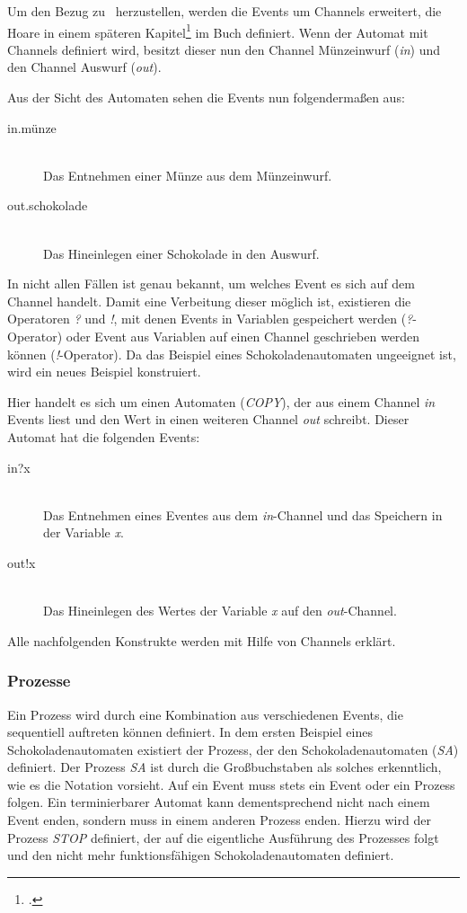 Um den Bezug zu \CA\ herzustellen, werden die Events um Channels erweitert, die Hoare in einem späteren Kapitel\footcite[Kap. 4.2]{CSPBOOK} im Buch definiert.
Wenn der Automat mit Channels definiert wird, besitzt dieser nun den Channel Münzeinwurf (\textit{in}) und den Channel Auswurf (\textit{out}).

Aus der Sicht des Automaten sehen die Events nun folgendermaßen aus:

\begin{description}
\item[in.münze]\hfill \\
Das Entnehmen einer Münze aus dem Münzeinwurf.
\item[out.schokolade]\hfill \\
Das Hineinlegen einer Schokolade in den Auswurf.
\end{description}

In nicht allen Fällen ist genau bekannt, um welches Event es sich auf dem Channel handelt. Damit eine Verbeitung dieser möglich ist, existieren die Operatoren \textit{?} und \textit{!}, mit denen Events in Variablen gespeichert werden (\textit{?}-Operator) oder Event aus Variablen auf einen Channel geschrieben werden können (\textit{!}-Operator). Da das Beispiel eines Schokoladenautomaten ungeeignet ist, wird ein neues Beispiel konstruiert. 

Hier handelt es sich um einen Automaten (\textit{COPY}), der aus einem Channel \textit{in} Events liest und den Wert in einen weiteren Channel \textit{out} schreibt. Dieser Automat hat die folgenden Events:

\begin{description}
\item[in?x]\hfill \\
Das Entnehmen eines Eventes aus dem \textit{in}-Channel und das Speichern in der Variable \textit{x}.
\item[out!x]\hfill \\
Das Hineinlegen des Wertes der Variable \textit{x} auf den \textit{out}-Channel.
\end{description}

Alle nachfolgenden Konstrukte werden mit Hilfe von Channels erklärt.

\subsubsection{Prozesse}
Ein Prozess wird durch eine Kombination aus verschiedenen Events, die sequentiell auftreten können definiert. In dem ersten Beispiel eines Schokoladenautomaten existiert der Prozess, der den  Schokoladenautomaten (\textit{SA}) definiert. Der Prozess \textit{SA} ist durch die Großbuchstaben als solches erkenntlich, wie es die Notation vorsieht. Auf ein Event muss stets ein Event oder ein Prozess folgen. Ein terminierbarer Automat kann dementsprechend nicht nach einem Event enden, sondern muss in einem anderen Prozess enden. Hierzu wird der Prozess \textit{STOP} definiert, der auf die eigentliche Ausführung des Prozesses folgt und den nicht mehr funktionsfähigen Schokoladenautomaten definiert.

